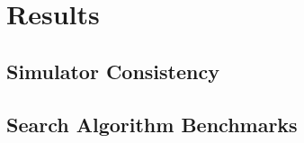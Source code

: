 \section{Results}
\label{sec:results}

\subsection{Simulator Consistency}

\subsection{Search Algorithm Benchmarks}
